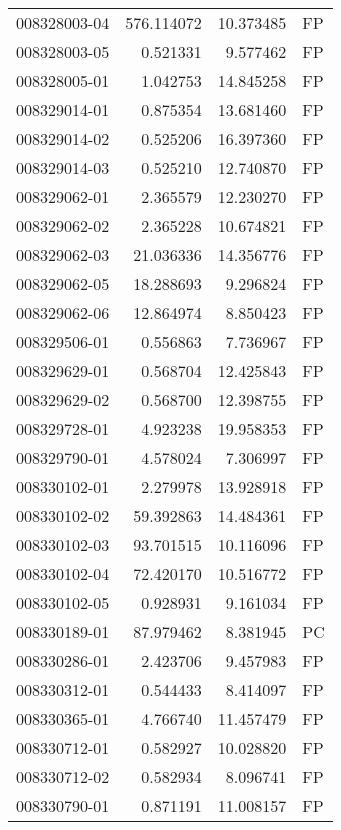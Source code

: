 \begin{tabular}{lrrl}
008328003-04 &  576.114072 &      10.373485 &   FP \\
008328003-05 &    0.521331 &       9.577462 &   FP \\
008328005-01 &    1.042753 &      14.845258 &   FP \\
008329014-01 &    0.875354 &      13.681460 &   FP \\
008329014-02 &    0.525206 &      16.397360 &   FP \\
008329014-03 &    0.525210 &      12.740870 &   FP \\
008329062-01 &    2.365579 &      12.230270 &   FP \\
008329062-02 &    2.365228 &      10.674821 &   FP \\
008329062-03 &   21.036336 &      14.356776 &   FP \\
008329062-05 &   18.288693 &       9.296824 &   FP \\
008329062-06 &   12.864974 &       8.850423 &   FP \\
008329506-01 &    0.556863 &       7.736967 &   FP \\
008329629-01 &    0.568704 &      12.425843 &   FP \\
008329629-02 &    0.568700 &      12.398755 &   FP \\
008329728-01 &    4.923238 &      19.958353 &   FP \\
008329790-01 &    4.578024 &       7.306997 &   FP \\
008330102-01 &    2.279978 &      13.928918 &   FP \\
008330102-02 &   59.392863 &      14.484361 &   FP \\
008330102-03 &   93.701515 &      10.116096 &   FP \\
008330102-04 &   72.420170 &      10.516772 &   FP \\
008330102-05 &    0.928931 &       9.161034 &   FP \\
008330189-01 &   87.979462 &       8.381945 &   PC \\
008330286-01 &    2.423706 &       9.457983 &   FP \\
008330312-01 &    0.544433 &       8.414097 &   FP \\
008330365-01 &    4.766740 &      11.457479 &   FP \\
008330712-01 &    0.582927 &      10.028820 &   FP \\
008330712-02 &    0.582934 &       8.096741 &   FP \\
008330790-01 &    0.871191 &      11.008157 &   FP \\

\end{tabular}
